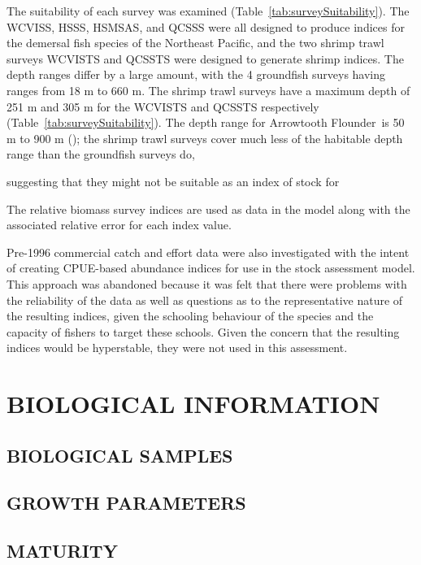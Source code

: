 \documentclass[11pt]{book}\usepackage[]{graphicx}\usepackage[]{color}
\newcommand{\fishname}{Arrowtooth Flounder}
\begin{document}
The suitability of each survey was examined (Table~\ref{tab:surveySuitability}). The WCVISS, HSSS, HSMSAS, and QCSSS were all designed to produce indices for the demersal fish species of the Northeast Pacific, and the two shrimp trawl surveys WCVISTS and QCSSTS were designed to generate shrimp indices. The depth ranges differ by a large amount, with the 4 groundfish surveys having ranges from 18 m to 660 m. The shrimp trawl surveys have a maximum depth of 251 m and 305 m for the WCVISTS and QCSSTS respectively (Table~\ref{tab:surveySuitability}). The depth range for \fishname\ is 50 m to 900 m (\citet{arf2001}); the shrimp trawl surveys cover much less of the habitable depth range than the groundfish surveys do, 

suggesting that they might not be suitable as an index of stock for

The relative biomass survey indices are used as data in the model along with the associated relative error for each index value.

Pre-1996 commercial catch and effort data were also investigated with the intent of creating CPUE-based abundance indices for use in the stock assessment model. This approach was abandoned because it was felt that there were problems with the reliability of the data as well as questions as to the representative nature of the resulting indices, given the schooling behaviour of the species and the capacity of fishers to target these schools. Given the concern that the resulting indices would be hyperstable, they were not used in this assessment.

\clearpage

\section{BIOLOGICAL INFORMATION}

\subsection{BIOLOGICAL SAMPLES}

\subsection{GROWTH PARAMETERS}

\subsection{MATURITY}
\end{document}
